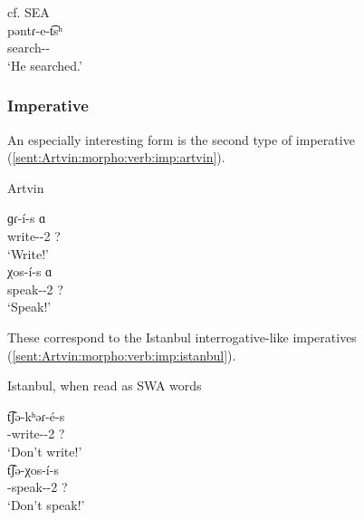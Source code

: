 
\begin{exe}
	\ex cf. SEA \label{sent:Artvin:morpho:verb:theme:search:SEA} \\
	\gll pəntɾ-e-t͡sʰ \\
	search-{\thgloss}-{\aor} \\
	\trans `He searched.' \\
\end{exe}

\subsubsection{Imperative}

An especially interesting form is the second type of imperative (\ref{sent:Artvin:morpho:verb:imp:artvin}).

\begin{exe}
	\ex Artvin \label{sent:Artvin:morpho:verb:imp:artvin}
	\begin{xlist}
		\ex \gll ɡɾ-\'i-s ɑ \\
		write-{\thgloss}-2{\sg} ? \\
		\trans `Write!' \\
		\ex \gll χos-\'i-s ɑ \\
		speak-{\thgloss}-2{\sg} ? \\
		\trans `Speak!' \\
	\end{xlist}
\end{exe}

These correspond to the Istanbul interrogative-like imperatives (\ref{sent:Artvin:morpho:verb:imp:istanbul}). 


\begin{exe}
	\ex Istanbul, when read as SWA words \label{sent:Artvin:morpho:verb:imp:istanbul}
	\begin{xlist}
		\ex \gll t͡ʃə-kʰəɾ-\'e-s \\
		{\neggloss}-write-{\thgloss}-2{\sg} ? \\
		\trans `Don't write!' \\
		\armenian{չգրե՞ս}
		\ex \gll t͡ʃə-χos-\'i-s \\
		{\neggloss}-speak-{\thgloss}-2{\sg} ? \\
		\trans `Don't speak!' \\
		\armenian{չխօսի՞ս} 
	\end{xlist}
\end{exe}



